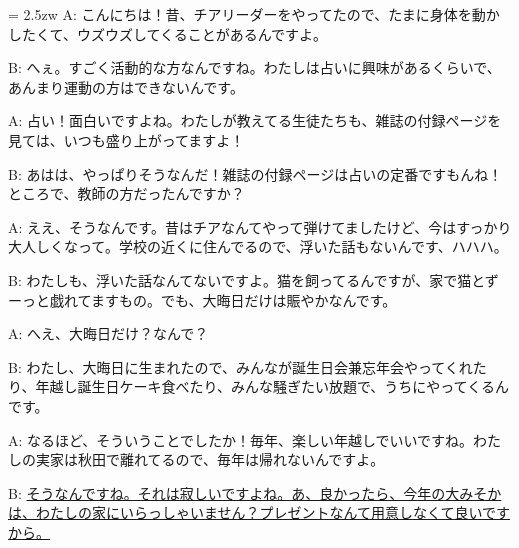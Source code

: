 \documentclass[11pt]{amsart}
\title{}
\author{}
\newenvironment{hangall}[1]{\hangindent = 2.5zw\everypar{\hangindent = 2.5zw}}{}
\begin{document}
\maketitle
\begin{hangall}{}%
A: こんにちは！昔、チアリーダーをやってたので、たまに身体を動かしたくて、ウズウズしてくることがあるんですよ。

B: へぇ。すごく活動的な方なんですね。わたしは占いに興味があるくらいで、あんまり運動の方はできないんです。

A: 占い！面白いですよね。わたしが教えてる生徒たちも、雑誌の付録ページを見ては、いつも盛り上がってますよ！

B: あはは、やっぱりそうなんだ！雑誌の付録ページは占いの定番ですもんね！ところで、教師の方だったんですか？

A: ええ、そうなんです。昔はチアなんてやって弾けてましたけど、今はすっかり大人しくなって。学校の近くに住んでるので、浮いた話もないんです、ハハハ。

B: わたしも、浮いた話なんてないですよ。猫を飼ってるんですが、家で猫とずーっと戯れてますもの。でも、大晦日だけは賑やかなんです。

A: へえ、大晦日だけ？なんで？

B: わたし、大晦日に生まれたので、みんなが誕生日会兼忘年会やってくれたり、年越し誕生日ケーキ食べたり、みんな騒ぎたい放題で、うちにやってくるんです。

A: なるほど、そういうことでしたか！毎年、楽しい年越しでいいですね。わたしの実家は秋田で離れてるので、毎年は帰れないんですよ。

B: \ul{そうなんですね。それは寂しいですよね。あ、良かったら、今年の大みそかは、わたしの家にいらっしゃいません？プレゼントなんて用意しなくて良いですから。}\end{hangall}
\end{document}
